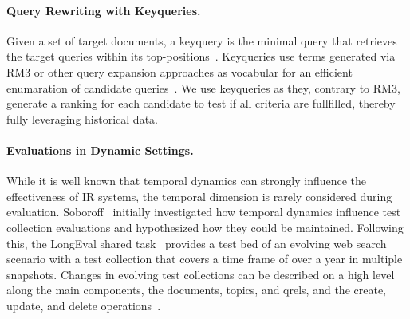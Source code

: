 \paragraph{Query Rewriting with Keyqueries.} Given a set of target documents, a keyquery is the minimal query that retrieves the target queries within its top-positions~\cite{gollub:2013a,hagen:2016b}. Keyqueries use terms generated via RM3 or other query expansion approaches as vocabular for an efficient enumaration of candidate queries~\cite{froebe:2022c,froebe:2021c}. We use keyqueries as they, contrary to RM3, generate a ranking for each candidate to test if all criteria are fullfilled, thereby fully leveraging historical data.

\paragraph{Evaluations in Dynamic Settings.} While it is well known that temporal dynamics can strongly influence the effectiveness of IR systems, the temporal dimension is rarely considered during evaluation. Soboroff~\cite{DBLP:conf/sigir/Soboroff06} initially investigated how temporal dynamics influence test collection evaluations and hypothesized how they could be maintained. Following this, the LongEval shared task~\cite{DBLP:conf/clef/AlkhalifaBDEAFG24,alkhalifa:2023} provides a test bed of an evolving web search scenario with a test collection that covers a time frame of over a year in multiple snapshots. Changes in evolving test collections can be described on a high level along the main components, the documents, topics, and qrels, and the create, update, and delete operations~\cite{keller:2024}. %
